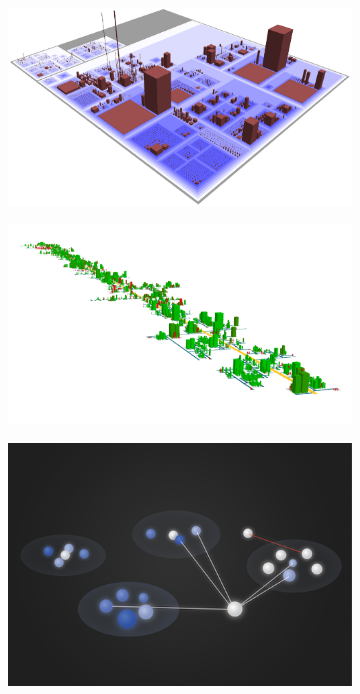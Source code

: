 \newlength\fwidth
\setlength{\fwidth}{.49\textwidth}
\begin{figure}[htb]
  \centering
  \begin{subfigure}[b]{\fwidth}
   \includegraphics[width=\textwidth]{figures/code-city}
    \label{fig:code-city}
  \end{subfigure}
  \hfill
  \begin{subfigure}[b]{\fwidth}
  	\includegraphics[width=\textwidth]{figures/softvis3d}
  	 \label{fig:softvis3d}
  \end{subfigure}
  \hfill
  \vspace{1em}
  \begin{subfigure}[b]{\fwidth}
  	\includegraphics[width=\textwidth]{figures/code-universe}

\end{subfigure}
\end{figure}
